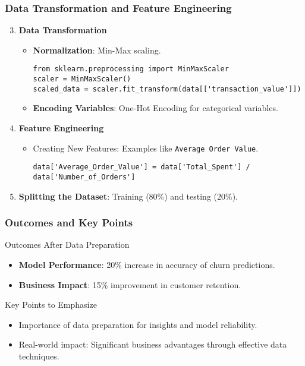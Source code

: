 \documentclass{beamer}
\begin{document}
\begin{frame}[fragile]
    \frametitle{Data Transformation and Feature Engineering}
    \begin{enumerate}
        \setcounter{enumi}{2}
        \item \textbf{Data Transformation}
        \begin{itemize}
            \item \textbf{Normalization}: Min-Max scaling.
            \begin{lstlisting}
from sklearn.preprocessing import MinMaxScaler
scaler = MinMaxScaler()
scaled_data = scaler.fit_transform(data[['transaction_value']])
            \end{lstlisting}
            \item \textbf{Encoding Variables}: One-Hot Encoding for categorical variables.
        \end{itemize}

        \item \textbf{Feature Engineering}
        \begin{itemize}
            \item Creating New Features: Examples like \texttt{Average Order Value}.
            \begin{lstlisting}
data['Average_Order_Value'] = data['Total_Spent'] / data['Number_of_Orders']
            \end{lstlisting}
        \end{itemize}

        \item \textbf{Splitting the Dataset}: Training (80\%) and testing (20\%).
    \end{enumerate}
\end{frame}

\begin{frame}[fragile]
    \frametitle{Outcomes and Key Points}
    \begin{block}{Outcomes After Data Preparation}
        \begin{itemize}
            \item \textbf{Model Performance}: 20\% increase in accuracy of churn predictions.
            \item \textbf{Business Impact}: 15\% improvement in customer retention.
        \end{itemize}
    \end{block}

    \begin{block}{Key Points to Emphasize}
        \begin{itemize}
            \item Importance of data preparation for insights and model reliability.
            \item Real-world impact: Significant business advantages through effective data techniques.
        \end{itemize}
    \end{block}
\end{frame}
\end{document}
